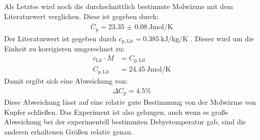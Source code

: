 \noindent Als Letztes wird noch die durchschnittlich bestimmte Molwärme mit dem Literaturwert verglichen. Diese ist gegeben durch:
\begin{align*}
  \overline{C}_\mathrm{p}=\SI{23.35(8)}{\joule\mole\per\kelvin}
\end{align*}
Der Literaturwert ist gegeben durch $c_\mathrm{p,Lit}=\SI{0.385}{\kilo\joule\per\kilo\gram\per\kelvin}$ \cite{Anleitung7}. Dieser wird um die Einheit zu korrigieren umgerechnet zu:
\begin{align*}
  c_\mathrm{Lit}\cdot M &= C_\mathrm{p,Lit} \\
  C_\mathrm{p,Lit} &= \SI{24.45}{\joule\mole\per\kelvin}
\end{align*}
Damit ergibt sich eine Abweichung von:
\begin{align*}
  \Delta C_\mathrm{p} = 4.5\%
\end{align*}
Diese Abweichung lässt auf eine relativ gute Bestimmung von der Molwärme von Kupfer schließen. Das Experiment ist also gelungen, auch wenn es große Abweichung bei der experimentell bestimmten
Debyetemperatur gab, sind die anderen erhaltenen Größen relativ genau.
